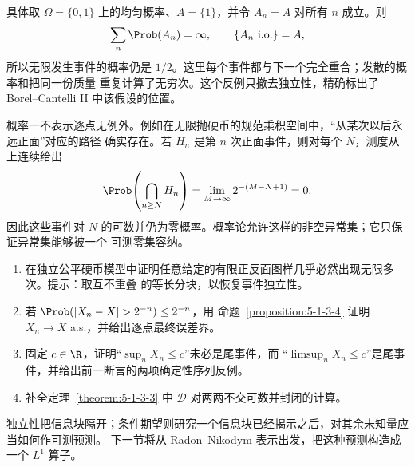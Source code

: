 \begin{example}[为何第二部分需要相关性假设]\label{ex:5-1-3-4}
具体取 $\Omega=\{0,1\}$ 上的均匀概率、$A=\{1\}$，并令 $A_n=A$ 对所有 $n$ 成立。则
\[
 \sum_n\Prob(A_n)=\infty,
 \qquad
 \{A_n\ \mathrm{i.o.}\}=A,
\]
所以无限发生事件的概率仍是 $1/2$。这里每个事件都与下一个完全重合；发散的概率和把同一份质量
重复计算了无穷次。这个反例只撤去独立性，精确标出了 Borel--Cantelli II 中该假设的位置。
\end{example}

概率一不表示逐点无例外。例如在无限抛硬币的规范乘积空间中，“从某次以后永远正面”对应的路径
确实存在。若 $H_n$ 是第 $n$ 次正面事件，则对每个 $N$，测度从上连续给出
\[
 \Prob\!\left(\bigcap_{n\ge N}H_n\right)
 =\lim_{M\to\infty}2^{-(M-N+1)}=0.
\]
因此这些事件对 $N$ 的可数并仍为零概率。概率论允许这样的非空异常集；它只保证异常集能够被一个
可测零集容纳。

\begin{exercise}
\begin{enumerate}
  \item 在独立公平硬币模型中证明任意给定的有限正反面图样几乎必然出现无限多次。提示：取互不重叠
  的等长分块，以恢复事件独立性。
  \item 若 $\Prob(|X_n-X|>2^{-n})\le2^{-n}$，用
  命题~\ref{proposition:5-1-3-4} 证明 $X_n\to X$ a.s.，并给出逐点最终误差界。
  \item 固定 $c\in\R$，证明“$\sup_nX_n\le c$”未必是尾事件，而
  “$\limsup_nX_n\le c$”是尾事件，并给出前一断言的两项确定性序列反例。
  \item 补全定理~\ref{theorem:5-1-3-3} 中 $\mathcal D$ 对两两不交可数并封闭的计算。
\end{enumerate}
\end{exercise}

独立性把信息块隔开；条件期望则研究一个信息块已经揭示之后，对其余未知量应当如何作可测预测。
下一节将从 Radon--Nikodym 表示出发，把这种预测构造成一个 $L^1$ 算子。

